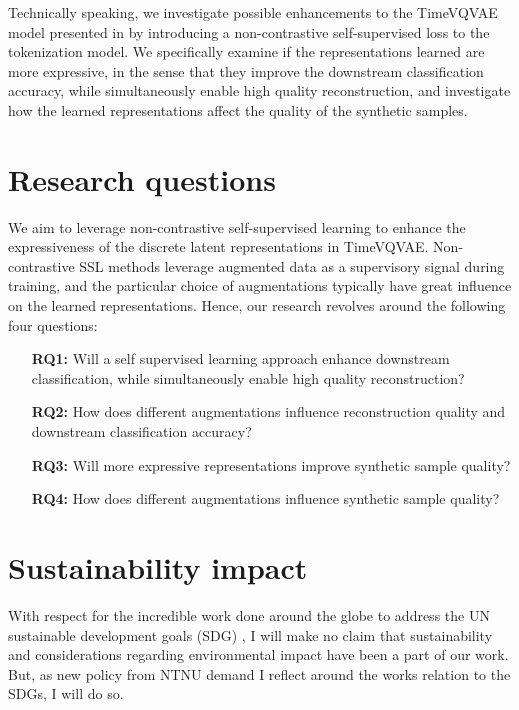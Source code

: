 \documentclass[../../thesis.tex]{subfiles}
\begin{document}
Technically speaking, we investigate possible enhancements to the TimeVQVAE model presented in \cite{TimeVQVAE} by introducing a non-contrastive self-supervised loss to the tokenization model. We specifically examine if the representations learned are more expressive, in the sense that they improve the downstream classification accuracy, while simultaneously enable high quality reconstruction, and investigate how the learned representations affect the quality of the synthetic samples.

\section{Research questions}

We aim to leverage non-contrastive self-supervised learning to enhance the expressiveness of the discrete latent representations in TimeVQVAE. Non-contrastive SSL methods leverage augmented data as a supervisory signal during training, and the particular choice of augmentations typically have great influence on the learned representations. Hence, our research revolves around the following four questions:
\begin{itemize}
	\item[\textbf{RQ1:}] Will a self supervised learning approach enhance downstream classification, while simultaneously enable high quality reconstruction?
	\item[\textbf{RQ2:}] How does different augmentations influence reconstruction quality and downstream classification accuracy? 
	\item[\textbf{RQ3:}] Will more expressive representations improve synthetic sample quality?
	\item[\textbf{RQ4:}] How does different augmentations influence synthetic sample quality?
\end{itemize}


\section{Sustainability impact}

With respect for the incredible work done around the globe to address the UN sustainable development goals (SDG) \cite{Agenda2023}, I will make no claim that sustainability and considerations regarding environmental impact have been a part of our work. But, as new policy from NTNU demand I reflect around the works relation to the SDGs, I will do so.\newline 
\end{document}
